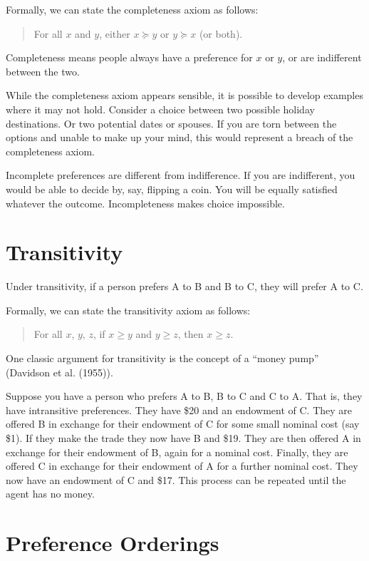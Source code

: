 \documentclass[
  letterpaper,
  DIV=11,
  numbers=noendperiod]{scrreprt}
\begin{document}
Formally, we can state the completeness axiom as follows:

\begin{quote}
For all \(x\) and \(y\), either \(x \succcurlyeq y\) or
\(y \succcurlyeq x\) (or both).
\end{quote}

Completeness means people always have a preference for \(x\) or \(y\),
or are indifferent between the two.

While the completeness axiom appears sensible, it is possible to develop
examples where it may not hold. Consider a choice between two possible
holiday destinations. Or two potential dates or spouses. If you are torn
between the options and unable to make up your mind, this would
represent a breach of the completeness axiom.

Incomplete preferences are different from indifference. If you are
indifferent, you would be able to decide by, say, flipping a coin. You
will be equally satisfied whatever the outcome. Incompleteness makes
choice impossible.

\hypertarget{transitivity}{%
\section{Transitivity}\label{transitivity}}

Under transitivity, if a person prefers A to B and B to C, they will
prefer A to C.

Formally, we can state the transitivity axiom as follows:

\begin{quote}
For all \(x\), \(y\), \(z\), if \(x \geq y\) and \(y \geq z\), then
\(x \geq z\).
\end{quote}

One classic argument for transitivity is the concept of a ``money pump''
(Davidson et al. (1955)).

Suppose you have a person who prefers A to B, B to C and C to A. That
is, they have intransitive preferences. They have \$20 and an endowment
of C. They are offered B in exchange for their endowment of C for some
small nominal cost (say \$1). If they make the trade they now have B and
\$19. They are then offered A in exchange for their endowment of B,
again for a nominal cost. Finally, they are offered C in exchange for
their endowment of A for a further nominal cost. They now have an
endowment of C and \$17. This process can be repeated until the agent
has no money.

\hypertarget{preference-orderings}{%
\section{Preference Orderings}\label{preference-orderings}}
\end{document}
